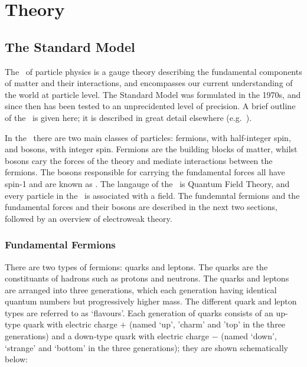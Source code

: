 \graphicspath{{Chapters/Theory/Figures/}}
\chapter{Theory}
\label{chap:Theory}

\section{The Standard Model}

The \sm\ of particle physics is a gauge theory describing the
fundamental components of matter and their interactions, and encompasses our
current understanding of the world at particle level. The Standard Model was
formulated in the 1970s, and since then has been tested to an unprecidented
level of precision. %
A brief outline of the \sm\ is given here; it is described in great detail
elsewhere (e.g.~\cite{ALTARELLI:2005zv}).

In the \sm\ there are two main classes of particles: fermions, with half-integer
spin, and bosons, with integer spin. Fermions are the building blocks of matter,
whilst bosons cary the forces of the theory and mediate interactions between the
fermions. The bosons responsible for carrying the fundamental forces all have
spin-1 and are known as .
The langauge of the \sm\ is Quantum Field Theory, and every particle in the \sm\
is associated with a field. The fundemntal fermions and the fundamental forces
and their bosons are described in the next two sections, followed by an overview
of electroweak theory.

\subsection{Fundamental Fermions}

There are two types of fermions: quarks and leptons. The quarks are the
constituants of hadrons such as protons and neutrons. 
The quarks and leptons are arranged into three generations, which each
generation having identical quantum numbers but progressively higher mass. The
different quark and lepton types are referred to as `flavours'. Each
generation of quarks consists of an up-type quark with electric charge
$+$\nicefrac{2}{3}
(named `up', 'charm' and 'top' in the three generations) and a down-type quark
with electric charge $-$\nicefrac{1}{3} (named `down', `strange' and `bottom' in the three
generations); they are shown schematically below:


